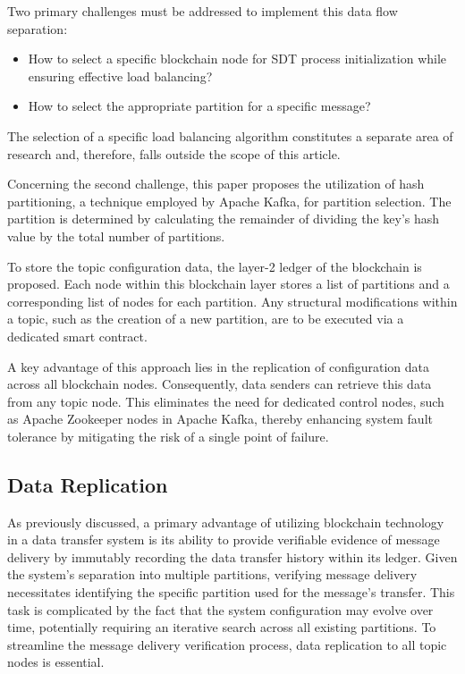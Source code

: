 \documentclass[10pt]{llncs}
\begin{document}
Two primary challenges must be addressed to implement this data flow separation:

\begin{itemize}
    \item How to select a specific blockchain node for SDT process initialization while ensuring effective load balancing?
    \item How to select the appropriate partition for a specific message?
\end{itemize}

The selection of a specific load balancing algorithm constitutes a separate area of research and, therefore, falls outside the scope of this article.

Concerning the second challenge, this paper proposes the utilization of hash partitioning, a technique employed by Apache Kafka, for partition selection.  
The partition is determined by calculating the remainder of dividing the key's hash value by the total number of partitions.

To store the topic configuration data, the layer-2 ledger of the blockchain is proposed. 
Each node within this blockchain layer stores a list of partitions and a corresponding list of nodes for each partition. 
Any structural modifications within a topic, such as the creation of a new partition, are to be executed via a dedicated smart contract.

A key advantage of this approach lies in the replication of configuration data across all blockchain nodes. 
Consequently, data senders can retrieve this data from any topic node. 
This eliminates the need for dedicated control nodes, such as Apache Zookeeper nodes in Apache Kafka, thereby enhancing system fault tolerance by mitigating the risk of a single point of failure.


\subsection{Data Replication}\label{data-replication}
As previously discussed, a primary advantage of utilizing blockchain technology in a data transfer system is its ability to provide verifiable evidence of message delivery by immutably recording the data transfer history within its ledger.
 Given the system's separation into multiple partitions, verifying message delivery necessitates identifying the specific partition used for the message's transfer. 
 This task is complicated by the fact that the system configuration may evolve over time, potentially requiring an iterative search across all existing partitions.
 To streamline the message delivery verification process, data replication to all topic nodes is essential.
\end{document}
